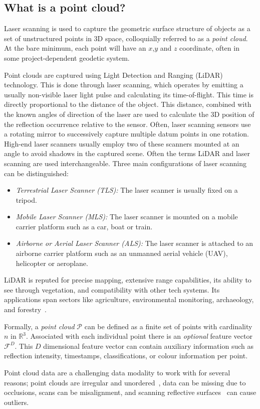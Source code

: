 \begin{snugshade}
\subsection*{What is a point cloud?}
Laser scanning is used to capture the geometric surface structure of objects as a set of unstructured points in 3D space, colloquially referred to as a \emph{point cloud}. At the bare minimum, each point will have an \(x\),\(y\) and \(z\) coordinate, often in some project-dependent geodetic system.

Point clouds are captured using Light Detection and Ranging (LiDAR) technology. This is done through laser scanning, which operates by emitting a usually non-visible laser light pulse and calculating its time-of-flight. This time is directly proportional to the distance of the object. This distance, combined with the known angles of direction of the laser are used to calculate the 3D position of the reflection occurrence relative to the sensor. Often, laser scanning sensors use a rotating mirror to successively capture multiple datum points in one rotation. High-end laser scanners usually employ two of these scanners mounted at an angle to avoid shadows in the captured scene. Often the terms LiDAR and laser scanning are used interchangeable. Three main configurations of laser scanning can be distinguished:
\begin{itemize}
\item \emph{Terrestrial Laser Scanner (TLS):} The laser scanner is usually fixed on a tripod.
\item \emph{Mobile Laser Scanner (MLS):} The laser scanner is mounted on a mobile carrier platform such as a car, boat or train.
\item \emph{Airborne or Aerial Laser Scanner (ALS):} The laser scanner is attached to an airborne carrier platform such as an unmanned aerial vehicle (UAV), helicopter or aeroplane.
\end{itemize}

LiDAR is reputed for precise mapping, extensive range capabilities, its ability to see through vegetation, and compatibility with other tech systems. Its applications span sectors like agriculture, environmental monitoring, archaeology, and forestry~\cite{di2021mobile}.

Formally, a \emph{point cloud} $\mathcal{P}$ can be defined as a finite set of points with cardinality $n$ in $\mathbb{R}^3$. Associated with each individual point there is an \emph{optional} feature vector $\mathcal{F}^D$. This $D$ dimensional feature vector can contain auxiliary information such as reflection intensity, timestamps, classifications, or colour information per point.

Point cloud data are a challenging data modality to work with for several reasons; point clouds are irregular and unordered~\cite{bello2020deep}, data can be missing due to occlusions, scans can be misalignment, and scanning reflective surfaces~\parencite{WangY16,Berger17} can cause outliers.
\end{snugshade}

